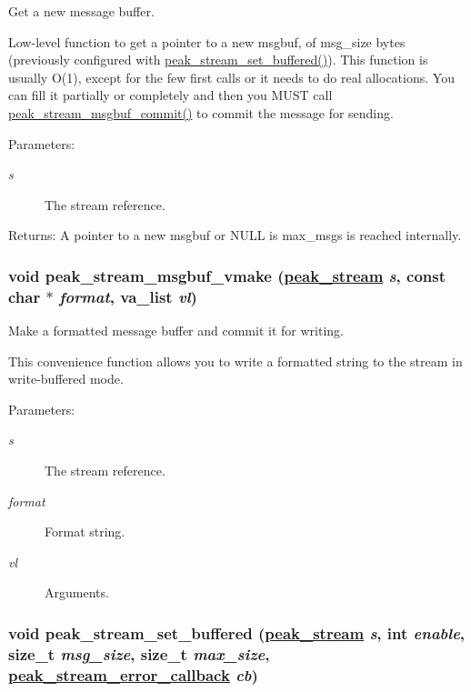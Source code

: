 Get a new message buffer. 

Low-level function to get a pointer to a new msgbuf, of msg\_\-size bytes (previously configured with \hyperlink{group__stream__buf_ga54}{peak\_\-stream\_\-set\_\-buffered()}). This function is usually O(1), except for the few first calls or it needs to do real allocations. You can fill it partially or completely and then you MUST call \hyperlink{group__stream__buf_ga58}{peak\_\-stream\_\-msgbuf\_\-commit()} to commit the message for sending.

\begin{Desc}
\item[Parameters:]
\begin{description}
\item[{\em s}]The stream reference.\end{description}
\end{Desc}
\begin{Desc}
\item[Returns:]A pointer to a new msgbuf or NULL is max\_\-msgs is reached internally. \end{Desc}
\hypertarget{group__stream__buf_ga7}{
\subsubsection[peak\_\-stream\_\-msgbuf\_\-vmake]{\setlength{\rightskip}{0pt plus 5cm}void peak\_\-stream\_\-msgbuf\_\-vmake (\hyperlink{group__stream_ga0}{peak\_\-stream} {\em s}, const char $\ast$ {\em format}, va\_\-list {\em vl})}}
\label{group__stream__buf_ga7}


Make a formatted message buffer and commit it for writing. 

This convenience function allows you to write a formatted string to the stream in write-buffered mode.

\begin{Desc}
\item[Parameters:]
\begin{description}
\item[{\em s}]The stream reference. \item[{\em format}]Format string. \item[{\em vl}]Arguments. \end{description}
\end{Desc}
\hypertarget{group__stream__buf_ga1}{
\subsubsection[peak\_\-stream\_\-set\_\-buffered]{\setlength{\rightskip}{0pt plus 5cm}void peak\_\-stream\_\-set\_\-buffered (\hyperlink{group__stream_ga0}{peak\_\-stream} {\em s}, int {\em enable}, size\_\-t {\em msg\_\-size}, size\_\-t {\em max\_\-size}, \hyperlink{group__stream__buf_ga0}{peak\_\-stream\_\-error\_\-callback} {\em cb})}}
\label{group__stream__buf_ga1}


